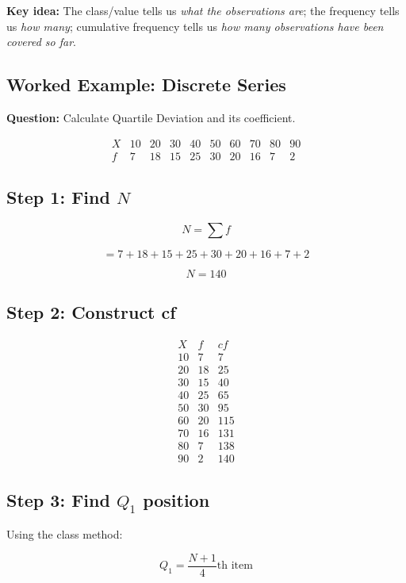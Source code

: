 \documentclass[12pt,a4paper]{article}
\begin{document}
\textbf{Key idea:} The class/value tells us \emph{what the observations are}; the
frequency tells us \emph{how many}; cumulative frequency tells us
\emph{how many observations have been covered so far}.

\subsection{Worked Example: Discrete Series}

\textbf{Question:} Calculate Quartile Deviation and its coefficient.

\[
\begin{array}{c|ccccccccc}
X&10&20&30&40&50&60&70&80&90\\
\hline
f&7&18&15&25&30&20&16&7&2
\end{array}
\]

\subsection*{Step 1: Find $N$}

\[
N=\sum f
\]

\[
=7+18+15+25+30+20+16+7+2
\]

\[
\boxed{N=140}
\]

\subsection*{Step 2: Construct cf}

\[
\begin{array}{c|c|c}
X&f&cf\\
\hline
10&7&7\\
20&18&25\\
30&15&40\\
40&25&65\\
50&30&95\\
60&20&115\\
70&16&131\\
80&7&138\\
90&2&140
\end{array}
\]

\subsection*{Step 3: Find $Q_1$ position}

Using the class method:

\[
Q_1=\frac{N+1}{4}\text{th item}
\]
\end{document}
